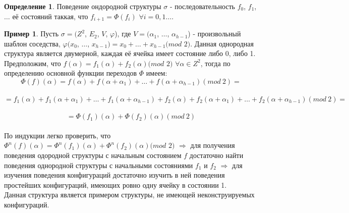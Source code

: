 \documentclass[a4paper, 12pt]{article}
\renewcommand{\phi}{\varphi}
\theoremstyle{definition}
\newtheorem*{definition}{Определение}
\newtheorem*{example1}{Пример}
\theoremstyle{plain}
\theoremstyle{remark}
\begin{document}
  \begin{definition}
    Поведение ондородной структуры $\sigma$ - последовательность $f_0$, $f_1$, $\ldots$ её состояний таккая, что $f_{i+1}=\Phi(f_i)$ $\forall i=0, 1\ldots$.
  \end{definition}
  \begin{example1}
    Пусть $\sigma=(Z^2$, $E_2$, $V$, $\phi$), где $V=(\alpha_1$, $\ldots$, $\alpha_{h-1}$) - произвольный шаблон соседства, $\phi(x_0$, $\ldots$, $x_{h-1})=x_0+\ldots+x_{h-1}(mod$ $2)$. Данная однородная структура является двумерной, каждая её ячейка имеет состояние либо 0, либо 1. Предположим, что $f(\alpha)=f_1(\alpha)+f_2(\alpha)(mod$ $2)$ $\forall\alpha\in Z^2$, тогда по определению основной функции переходов $\Phi$ имеем:\\
    $$\Phi(f)(\alpha)=f(\alpha)+f(\alpha+\alpha_1)+\ldots+f(\alpha+\alpha_{h-1})(mod \ 2)=$$\\$$=f_1(\alpha)+f_1(\alpha+\alpha_1)+\ldots+f_1(\alpha+\alpha_{h-1})+f_2(\alpha)+f_2(\alpha+\alpha_1)+\ldots+f_2(\alpha+\alpha_{h-1})(mod \ 2)=$$\\$$=\Phi(f_1)(\alpha)+\Phi(f_2)(\alpha)(mod \ 2)$$\\
    По индукции легко проверить, что $\Phi^n(f)(\alpha)=\Phi^n(f_1)(\alpha)+\Phi^n(f_2)(\alpha)(mod$ $2)$ $\Longrightarrow$ для получения поведения одородной структуры с начальным состоянием $f$ достаточно найти поведения однородной структуры с начальными состояниями $f_1$ и $f_2$ $\Longrightarrow$ для изучения поведения конфигураций достаточно изучить в ней поведения простейших конфигураций, имеющих ровно одну ячейку в состоянии 1.\\
    Данная структура является примером структуры, не имеющей неконструируемых конфигураций.
  \end{example1}
\end{document}
